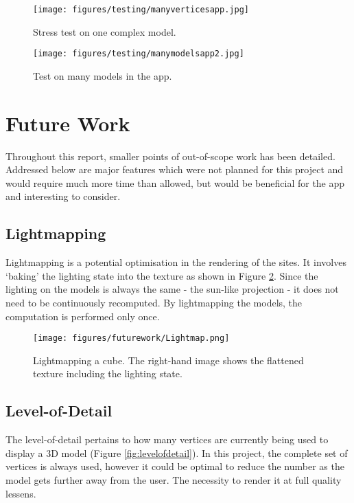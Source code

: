 \documentclass{article}
\begin{document}
\begin{figure}[H]
\centering
\begin{minipage}{.5\textwidth}
  \centering
  \texttt{[image: figures/testing/manyverticesapp.jpg]}
    \caption{Stress test on one complex model.}
  \label{fig:manyverticesapp}
\end{minipage}%
\begin{minipage}{.5\textwidth}
  \centering
  \texttt{[image: figures/testing/manymodelsapp2.jpg]}
  \caption{Test on many models in the app.}
    \label{fig:manymodelsapp}
\end{minipage}
\end{figure}

\section{Future Work}
\label{futurework}
Throughout this report, smaller points of out-of-scope work has been detailed. Addressed below are major features which were not planned for this project and would require much more time than allowed, but would be beneficial for the app and interesting to consider.

\subsection{Lightmapping}
Lightmapping is a potential optimisation in the rendering of the sites. It involves `baking' the lighting state into the texture as shown in Figure \ref{fig:lightmapping}. Since the lighting on the models is always the same - the sun-like projection - it does not need to be continuously recomputed. By lightmapping the models, the computation is performed only once.

\begin{figure}
\centering
    \texttt{[image: figures/futurework/Lightmap.png]}
        \caption{Lightmapping a cube. The right-hand image shows the flattened texture including the lighting state. \cite{futurework:lightmapping}}
        \label{fig:lightmapping}
\end{figure}

\subsection{Level-of-Detail}
The level-of-detail pertains to how many vertices are currently being used to display a 3D model (Figure \ref{fig:levelofdetail}). In this project, the complete set of vertices is always used, however it could be optimal to reduce the number as the model gets further away from the user. The necessity to render it at full quality lessens. 
\end{document}
